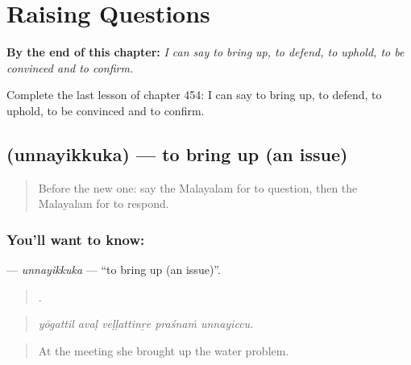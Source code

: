 
\chapter{Raising Questions}
\label{ch:ml-raising-questions}

\begin{chapteropening}
\textbf{By the end of this chapter:} \emph{I can say to bring up, to defend, to uphold, to be convinced and to confirm.}

Complete the last lesson of chapter 454: I can say to bring up, to defend, to uphold, to be convinced and to confirm.
\end{chapteropening}

\section[\texorpdfstring{\ml{ഉന്നയിക്കുക} (unnayikkuka)}{ഉന്നയിക്കുക (unnayikkuka)}]{ (unnayikkuka) — to bring up (an issue)}

\label{lesson:ML-C454-unnayikkuka}



\begin{quote}
Before the new one: say the Malayalam for to question, then the Malayalam for to respond.
\end{quote}

\subsection*{You'll want to know: }
\textbf{} — \emph{unnayikkuka} — \textquotedblleft{}to bring up (an issue)\textquotedblright{}.

\begin{quote}
    .
\end{quote}

\begin{quote}
\emph{yōgattil avaḷ veḷḷattinṟe praśnaṁ unnayiccu.}
\end{quote}

\begin{quote}
At the meeting she brought up the water problem.
\end{quote}

